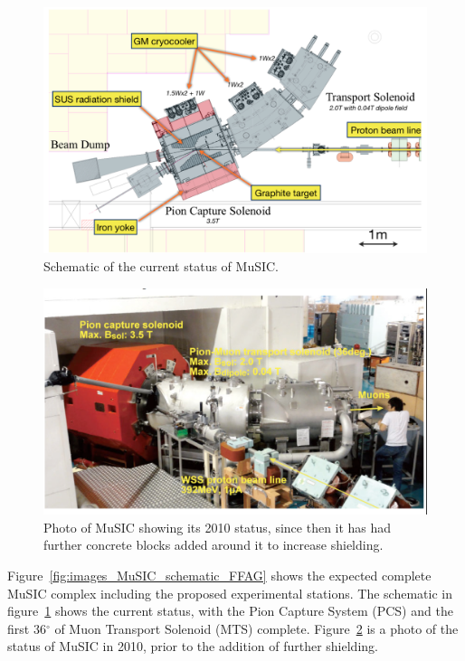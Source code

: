 \begin{figure}[htbp]
  \centering
    \includegraphics[width=.9\textwidth]{images/MuSIC_current_schematic.png}
  \caption{Schematic of the current status of MuSIC.}
  \label{fig:images_MuSIC_current_schematic}
\end{figure}
\begin{figure}[htbp]
  \centering
    \includegraphics[width=.9\textwidth]{images/MuSIC_photo.png}
  \caption{Photo of MuSIC showing its 2010 status, since then it has had further concrete blocks added around it to increase shielding.}
  \label{fig:images_MuSIC_photo}
\end{figure}

Figure~\ref{fig:images_MuSIC_schematic_FFAG} shows the expected complete MuSIC complex including the proposed experimental stations. The schematic in figure~\ref{fig:images_MuSIC_current_schematic} shows the current status, with the Pion Capture System (PCS) and the first 36\(^{\circ}\) of Muon Transport Solenoid (MTS) complete. Figure~\ref{fig:images_MuSIC_photo} is a photo of the status of MuSIC in 2010, prior to the addition of further shielding.

